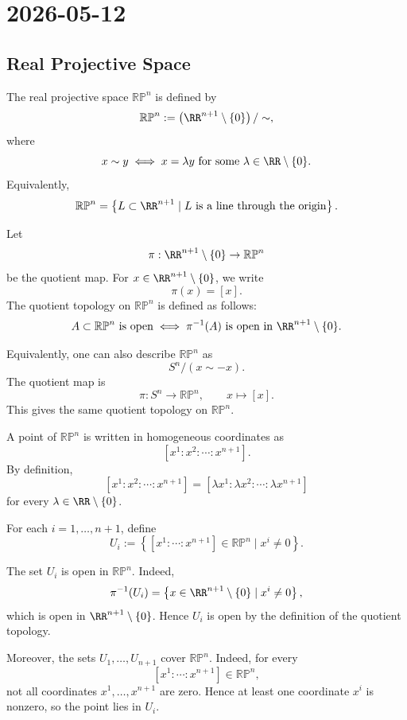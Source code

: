 \section{2026-05-12}

\subsection{Real Projective Space}

\begin{definition}
The real projective space $\mathbb{RP}^n$ is defined by
\[
  \mathbb{RP}^n
  :=
  \left(\RR^{n+1} \setminus \{0\}\right)/\sim,
\]
where
\[
  x \sim y
  \iff
  x = \lambda y
  \text{ for some } \lambda \in \RR \setminus \{0\}.
\]
Equivalently,
\[
  \mathbb{RP}^n
  =
  \left\{
    L \subset \RR^{n+1}
    \mid
    L \text{ is a line through the origin}
  \right\}.
\]
\end{definition}

Let
\[
  \pi : \RR^{n+1} \setminus \{0\} \to \mathbb{RP}^n
\]
be the quotient map. For $x \in \RR^{n+1} \setminus \{0\}$, we write
\[
  \pi(x) = [x].
\]
The quotient topology on $\mathbb{RP}^n$ is defined as follows:
\[
  A \subset \mathbb{RP}^n \text{ is open}
  \iff
  \pi^{-1}(A) \text{ is open in } \RR^{n+1} \setminus \{0\}.
\]

Equivalently, one can also describe $\mathbb{RP}^n$ as
\[
  S^n/(x \sim -x).
\]
The quotient map is
\[
  \pi : S^n \to \mathbb{RP}^n,
  \qquad
  x \mapsto [x].
\]
This gives the same quotient topology on $\mathbb{RP}^n$.

\begin{definition}
A point of $\mathbb{RP}^n$ is written in homogeneous coordinates as
\[
  [x^1 : x^2 : \cdots : x^{n+1}].
\]
By definition,
\[
  [x^1 : x^2 : \cdots : x^{n+1}]
  =
  [\lambda x^1 : \lambda x^2 : \cdots : \lambda x^{n+1}]
\]
for every $\lambda \in \RR \setminus \{0\}$.
\end{definition}

For each $i = 1,\dots,n+1$, define
\[
  U_i
  :=
  \left\{
    [x^1 : \cdots : x^{n+1}]
    \in \mathbb{RP}^n
    \mid
    x^i \neq 0
  \right\}.
\]

The set $U_i$ is open in $\mathbb{RP}^n$. Indeed,
\[
  \pi^{-1}(U_i)
  =
  \left\{
    x \in \RR^{n+1} \setminus \{0\}
    \mid
    x^i \neq 0
  \right\},
\]
which is open in $\RR^{n+1} \setminus \{0\}$. Hence $U_i$ is open by the definition of the quotient topology.

Moreover, the sets $U_1,\dots,U_{n+1}$ cover $\mathbb{RP}^n$. Indeed, for every
\[
  [x^1 : \cdots : x^{n+1}] \in \mathbb{RP}^n,
\]
not all coordinates $x^1,\dots,x^{n+1}$ are zero. Hence at least one coordinate $x^i$ is nonzero, so the point lies in $U_i$.


